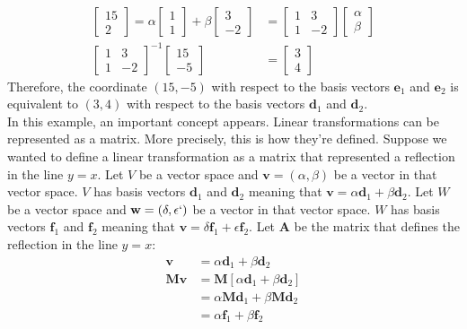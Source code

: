 \documentclass[a4paper,12pt]{article}
\newcommand{\matrx}[1]{\bm{#1}}
\newcommand{\vectr}[1]{\textbf{#1}}
\begin{document}
	\begin{align}
		\begin{bmatrix}
			15 \\ 2
		\end{bmatrix} = \alpha \begin{bmatrix}
			1 \\ 1 
		\end{bmatrix} + \beta \begin{bmatrix}
			3 \\ -2
		\end{bmatrix} &= \begin{bmatrix}
			1 & 3 \\ 
			1 & -2 
		\end{bmatrix} \begin{bmatrix}
			\alpha \\ \beta
		\end{bmatrix} \\
		\begin{bmatrix}
			1 & 3 \\
			1 & -2 
		\end{bmatrix}^{-1} 
		\begin{bmatrix}
			15 \\ -5
		\end{bmatrix}
		&= \begin{bmatrix}
			3 \\ 4
		\end{bmatrix}
	\end{align}
	Therefore, the coordinate $ (15, -5) $ with respect to the basis vectors $ \vectr{e}_1 $ and $ \vectr{e}_2 $ is equivalent to $ (3, 4) $ with respect to the basis vectors $ \vectr{d}_1 $ and $ \vectr{d}_2 $. \\	
	In this example, an important concept appears. Linear transformations can be represented as a matrix. More precisely, this is how they're defined. Suppose we wanted to define a linear transformation as a matrix that represented a reflection in the line $ y = x $. Let $ V $ be a vector space and $ \vectr{v} = (\alpha, \beta) $ be a vector in that vector space. $ V $ has basis vectors $ \vectr{d}_1 $ and $ \vectr{d}_2 $ meaning that $ \vectr{v} = \alpha \vectr{d}_1 + \beta \vectr{d}_2 $. Let $ W $ be a vector space and $ \vectr{w} = (\delta, \epsilon`) $ be a vector in that vector space. $ W $ has basis vectors $ \vectr{f}_1 $ and $ \vectr{f}_2 $ meaning that $ \vectr{v} = \delta \vectr{f}_1 + \epsilon \vectr{f}_2 $. Let $ \matrx{A} $ be the matrix that defines the reflection in the line $ y = x $:
	\begin{align}
		\vectr{v} &= \alpha \vectr{d}_1 + \beta \vectr{d}_2 \\
		\matrx{M} \vectr{v} &= \matrx{M} [ \alpha \vectr{d}_1 + \beta \vectr{d}_2] \\
		&= \alpha \matrx{M} \vectr{d}_1 + \beta \matrx{M} \vectr{d}_2 \\
		&= \alpha \vectr{f}_1 + \beta \vectr{f}_2
	\end{align}
\end{document}
